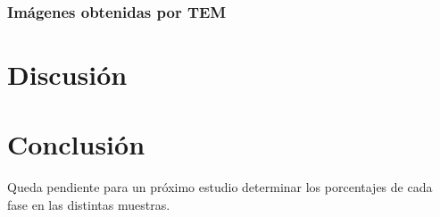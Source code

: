 \documentclass[12pt]{article}
\theoremstyle{definition}
\theoremstyle{remark}
\begin{document}
\subsubsection{Imágenes obtenidas por TEM}



\section{Discusión}
\section{Conclusión}
Queda pendiente para un próximo estudio determinar los porcentajes de cada fase en las distintas muestras. 

\newpage

\nocite{*} 


\end{document}

